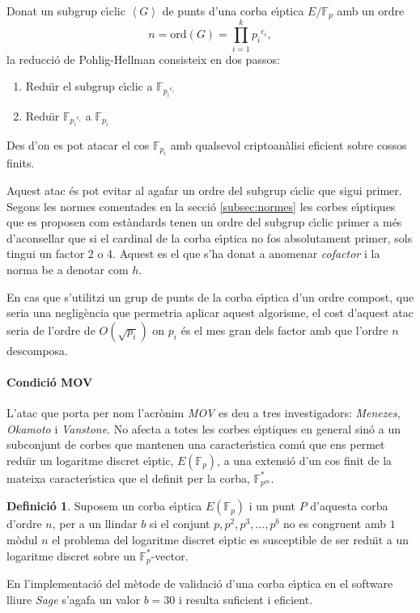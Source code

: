 \documentclass[12pt,twoside,catalan,a4paper]{book}%
\numberwithin{figure}{section}		%
\theoremstyle{definition}   			%
\newtheorem{defi}{Definici\'o}[chapter]%
\def\ce{corba e\lgem{}\'{\i}ptica}%
\def\ces{corbes e\lgem{}\'{\i}ptiques}%
\def\cf{cos finit}%
\def\cfs{cossos finits}%
\def\sgc{subgrup c\'{\i}clic}%
\def\ecdlp{logaritme discret e\lgem{}\'{\i}ptic}%
\newcommand{\F}{\ensuremath{\mathbb{F}}}%
\newcommand{\Fp}{\ensuremath{\mathbb{F}_p}}%
\newcommand{\EFp}{\ensuremath{E(\mathbb{F}_p)}}%
\theoremstyle{saltolinea}   			%
\begin{document}
Donat un \sgc{} $\left< G \right>$ de punts d'una \ce{} $E/\Fp$ amb un ordre 
$$n = \mathrm{ord}(G)= \prod_{i=1}^{k} {p_{i}}^{e_{i}},$$
la reducci\'o de Pohlig-Hellman consisteix en dos passos:
\begin{enumerate}
 \item Redu\"{\i}r el \sgc{} a $\mathbb{F}_{{p_i}^{e_i}}$
 \item Redu\"{\i}r $\mathbb{F}_{{p_i}^{e_i}}$ a $\mathbb{F}_{p_i}$
\end{enumerate}
Des d'on es pot atacar el cos $\mathbb{F}_{p_i}$ amb qualsevol criptoan\`alisi eficient sobre \cfs{}.

Aquest atac \'es pot evitar al agafar un ordre del \sgc{} que sigui primer. Segons les normes comentades en la secci\'o \ref{subsec:normes} les \ces{} que es proposen com est\`andards tenen un ordre del \sgc{} primer a m\'es d'aconsellar que si el cardinal de la \ce{} no fos absolutament primer, sols tingui un factor 2 o 4. Aquest es el que s'ha donat a anomenar \emph{cofactor} i la norma \cite{P1363} be a denotar com $h$.

En cas que s'utilitzi un grup de punts de la \ce{} d'un ordre compost, que seria una neglig\`encia que permetria aplicar aquest algorisme, el cost d'aquest atac seria de l'ordre de $O\left(\sqrt{p_{i}}\right)$ on $p_{i}$ \'es el mes gran dels factor amb que l'ordre $n$ descomposa.

\paragraph{Condici\'o MOV}

L'atac que porta per nom l'acr\`onim \emph{MOV} es deu a tres investigadors: \emph{Menezes}, \emph{Okamoto} i \emph{Vanstone}. No afecta a totes les \ces{} en general sin\'o a un subconjunt de corbes que mantenen una caracter\'{\i}stica com\'u que ens permet redu\"{\i}r un \ecdlp, \EFp, a una extensi\'o d'un \cf{} de la mateixa caracter\'{\i}stica que el definit per la corba, $\F_{p^m}^{*}$.

\begin{defi}
Suposem un \ce{} \EFp{} i un punt $P$ d'aquesta corba d'ordre $n$, per a un llindar $b$ si el conjunt $p,p^2,p^3,\dots,p^b$ no es congruent amb $1$ m\`odul $n$ el problema del logaritme discret e\lgem{}\'{\i}ptic es susceptible de ser redu\"{\i}t a un logaritme discret sobre un $\F^{*}_{p}$-vector.
\end{defi}

En l'implementaci\'o del m\`etode de validaci\'o d'una \ce{} en el software lliure \emph{Sage} s'agafa un valor $b=30$ i resulta suficient i eficient.
\end{document}
